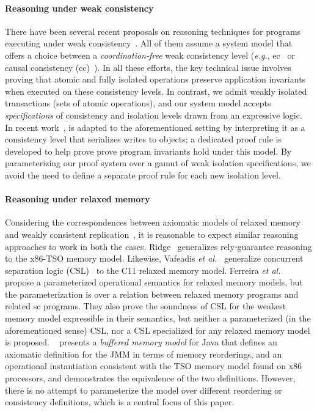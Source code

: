 \paragraph{Reasoning under weak consistency} There have been several
recent proposals on reasoning techniques for programs executing under
weak consistency~\cite{bailisvldb, alvarocalm,
  gotsmanpopl16,redblueatc, redblueosdi, ecinec}. All of them assume a
system model that offers a choice between a \emph{coordination-free}
weak consistency level (\emph{e.g.}, {\sc ec}~\cite{redblueosdi,
  redblueatc, ecinec, alvarocalm, bailisvldb} or causal consistency
({\sc cc})~\cite{gotsmanpopl16}). In all these efforts, the key
technical issue involves proving that atomic and fully isolated
operations preserve application invariants when executed on these
consistency levels.  In contrast, we admit weakly isolated
transactions (sets of atomic operations), and our system model accepts
\emph{specifications} of consistency and isolation levels drawn from
an expressive logic.  In recent work~\cite{gotsmanpopl16},
 is adapted to the aforementioned
setting by interpreting it as a consistency level that serializes
writes to objects; a dedicated proof rule is developed to help prove
prove program invariants hold under this model. By parameterizing our
proof system over a gamut of weak isolation specifications, we avoid
the need to define a separate proof rule for each new isolation level.

\paragraph{Reasoning under relaxed memory} Considering the
correspondences between axiomatic models of relaxed
memory~\cite{battycpp} and weakly consistent
replication~\cite{burckhardt14}, it is reasonable to expect similar
reasoning approaches to work in both the cases. Ridge~\cite{rgtso}
generalizes rely-guarantee reasoning to the x86-TSO memory model.
Likewise, Vafeadis \emph{et al.}~\cite{rsl13} generalize concurrent
separation logic (CSL)~\cite{csl} to the C11 relaxed memory model.
Ferreira \emph{et al.}~\cite{ferreira10} propose a parameterized
operational semantics for relaxed memory models, but the
parameterization is over a relation between relaxed memory programs
and related {\sc sc} programs. They also prove the soundness of CSL
for the weakest memory model expressible in their semantics, but
neither a parameterized (in the aforementioned sense) CSL, nor a CSL
specialized for any relaxed memory model is proposed.  ~\cite{DLZ+13}
presents a \emph{buffered memory model} for Java that defines an
axiomatic definition for the JMM in terms of memory reorderings, and
an operational instantiation consistent with the TSO memory model
found on x86 processors, and demonstrates the equivalence of the two
definitions.  However, there is no attempt to parameterize the model
over different reordering or consistency definitions, which is a central
focus of this paper.

